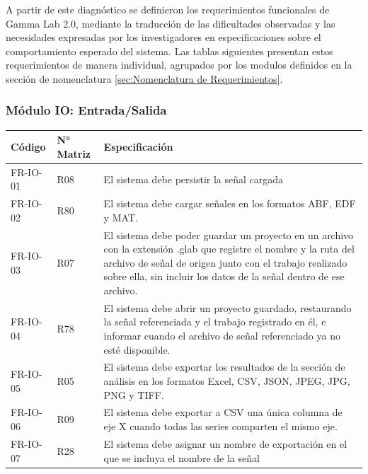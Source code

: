 \documentclass[12pt, letterpaper]{article}
\begin{document}
A partir de este diagnóstico se definieron los requerimientos funcionales de Gamma Lab 2.0, mediante la traducción de las dificultades observadas y las necesidades expresadas por los investigadores en especificaciones sobre el comportamiento esperado del sistema. Las tablas siguientes presentan estos requerimientos de manera individual, agrupados por los modulos definidos en la sección de nomenclatura \ref{sec:Nomenclatura de Requerimientos}.


\subsubsection{Módulo IO: Entrada/Salida}

\begin{longtable}{|p{2.5cm}|p{2.5cm}|p{10.1cm}|}
\hline
\rowcolor{gray!25}
\textbf{Código} & \textbf{N° Matriz} & \textbf{Especificación} \\
\hline
\endhead

\hline
\endlastfoot

FR-IO-01 & R08 & El sistema debe persistir la señal cargada \\
\hline
FR-IO-02 & R80 & El sistema debe cargar señales en los formatos ABF, EDF y MAT. \\
\hline
FR-IO-03 & R07 & El sistema debe poder guardar un proyecto en un archivo con la extensión .glab que registre el nombre y la ruta del archivo de señal de origen junto con el trabajo realizado sobre ella, sin incluir los datos de la señal dentro de ese archivo. \\
\hline
FR-IO-04 & R78 & El sistema debe abrir un proyecto guardado, restaurando la señal referenciada y el trabajo registrado en él, e informar cuando el archivo de señal referenciado ya no esté disponible. \\
\hline
FR-IO-05 & R05 & El sistema debe exportar los resultados de la sección de análisis en los formatos Excel, CSV, JSON, JPEG, JPG, PNG y TIFF. \\
\hline
FR-IO-06 & R09 & El sistema debe exportar a CSV una única columna de eje X cuando todas las series comparten el mismo eje. \\
\hline
FR-IO-07 & R28 & El sistema debe asignar un nombre de exportación en el que se incluya el nombre de la señal \\

\end{longtable}
\vspace{-0.5em}
\label{tab:fr-io}
\end{document}
